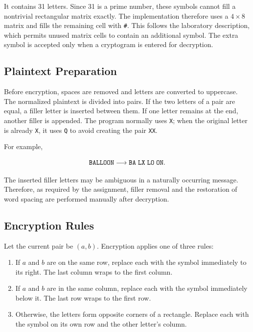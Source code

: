 \documentclass[12pt,a4paper]{article}
\begin{document}
It contains 31 letters. Since 31 is a prime number, these symbols cannot fill a nontrivial rectangular matrix exactly. The implementation therefore uses a $4\times8$ matrix and fills the remaining cell with \texttt{\#}. This follows the laboratory description, which permits unused matrix cells to contain an additional symbol. The extra symbol is accepted only when a cryptogram is entered for decryption.

\subsection{Plaintext Preparation}

Before encryption, spaces are removed and letters are converted to uppercase. The normalized plaintext is divided into pairs. If the two letters of a pair are equal, a filler letter is inserted between them. If one letter remains at the end, another filler is appended. The program normally uses \texttt{X}; when the original letter is already \texttt{X}, it uses \texttt{Q} to avoid creating the pair \texttt{XX}.

For example,

\begin{equation}
  \texttt{BALLOON}\longrightarrow
  \texttt{BA\;LX\;LO\;ON}.
\end{equation}

The inserted filler letters may be ambiguous in a naturally occurring message. Therefore, as required by the assignment, filler removal and the restoration of word spacing are performed manually after decryption.

\subsection{Encryption Rules}

Let the current pair be $(a,b)$. Encryption applies one of three rules:

\begin{enumerate}
  \item If $a$ and $b$ are on the same row, replace each with the symbol immediately to its right. The last column wraps to the first column.
  \item If $a$ and $b$ are in the same column, replace each with the symbol immediately below it. The last row wraps to the first row.
  \item Otherwise, the letters form opposite corners of a rectangle. Replace each with the symbol on its own row and the other letter's column.
\end{enumerate}
\end{document}
